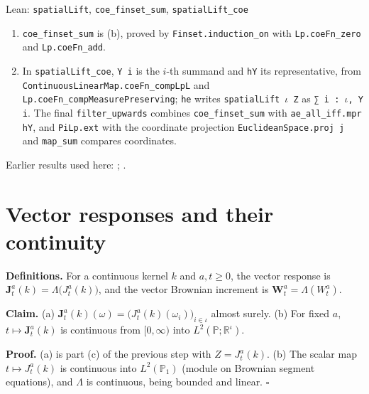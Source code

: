 \documentclass[11pt,a4paper]{article}
\begin{document}
\begin{leanbox}{Lean: \texttt{spatialLift}, \texttt{coe\_\allowbreak{}finset\_\allowbreak{}sum}, \texttt{spatialLift\_\allowbreak{}coe}}
\begin{enumerate}
\item \texttt{coe\_\allowbreak{}finset\_\allowbreak{}sum} is (b), proved by \texttt{Finset.\allowbreak{}induction\_\allowbreak{}on} with \texttt{Lp.\allowbreak{}coe\allowbreak{}Fn\_\allowbreak{}zero} and \texttt{Lp.\allowbreak{}coe\allowbreak{}Fn\_\allowbreak{}add}.

\item In \texttt{spatial\allowbreak{}Lift\_\allowbreak{}coe}, \texttt{Y i} is the \(i\)-th summand and \texttt{h\allowbreak{}Y} its representative, from \texttt{Continuous\allowbreak{}Linear\allowbreak{}Map.\allowbreak{}coe\allowbreak{}Fn\_\allowbreak{}comp\allowbreak{}Lp\allowbreak{}L} and \texttt{Lp.\allowbreak{}coe\allowbreak{}Fn\_\allowbreak{}comp\allowbreak{}Measure\allowbreak{}Preserving}; \texttt{he} writes \texttt{spatial\allowbreak{}Lift \ensuremath{\iota} Z} as \texttt{∑ i : \ensuremath{\iota}, Y i}. The final \texttt{filter\_\allowbreak{}upwards} combines \texttt{coe\_\allowbreak{}finset\_\allowbreak{}sum} with \texttt{ae\_\allowbreak{}all\_\allowbreak{}iff.\allowbreak{}mpr h\allowbreak{}Y}, and \texttt{Pi\allowbreak{}Lp.\allowbreak{}ext} with the coordinate projection \texttt{Euclidean\allowbreak{}Space.\allowbreak{}proj j} and \texttt{map\_\allowbreak{}sum} compares coordinates.

\end{enumerate}
\end{leanbox}


Earlier results used here: \cite[Section~3.8.16]{LangevinLean2026ULASC}; \cite[Section~3.8.17]{LangevinLean2026ULASC}.

\section{\texorpdfstring{Vector responses and their continuity}{Vector responses and their continuity}}


\textbf{Definitions.} For a continuous kernel \(k\) and \(a,t\ge0\), the vector response is \(\mathbf J^a_t(k)=\Lambda\bigl(J^a_t(k)\bigr)\), and the vector Brownian increment is \(\mathbf W^a_t=\Lambda(W^a_t)\).




\textbf{Claim.} (a) \(\mathbf J^a_t(k)(\omega)=\bigl(J^a_t(k)(\omega_i)\bigr)_{i\in\iota}\) almost surely. (b) For fixed \(a\), \(t\mapsto\mathbf J^a_t(k)\) is continuous from \([0,\infty)\) into \(L^2(\mathbb P;\mathbb R^\iota)\).




\textbf{Proof.} (a) is part (c) of the previous step with \(Z=J^a_t(k)\). (b) The scalar map \(t\mapsto J^a_t(k)\) is continuous into \(L^2(\mathbb P_1)\) (module on Brownian segment equations), and \(\Lambda\) is continuous, being bounded and linear. \(\square\)
\end{document}

